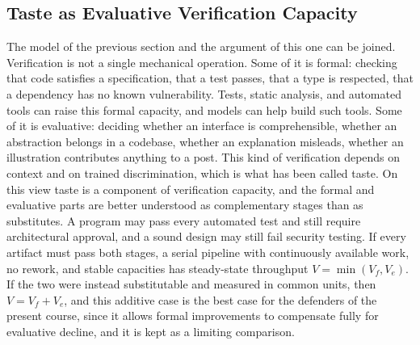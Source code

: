 \documentclass[11pt,a4paper]{article}
\theoremstyle{remark}
\begin{document}
\subsection{Taste as Evaluative Verification Capacity}

The model of the previous section and the argument of this one can be joined. Verification is not a single mechanical operation. Some of it is formal: checking that code satisfies a specification, that a test passes, that a type is respected, that a dependency has no known vulnerability. Tests, static analysis, and automated tools can raise this formal capacity, and models can help build such tools. Some of it is evaluative: deciding whether an interface is comprehensible, whether an abstraction belongs in a codebase, whether an explanation misleads, whether an illustration contributes anything to a post. This kind of verification depends on context and on trained discrimination, which is what has been called taste. On this view taste is a component of verification capacity, and the formal and evaluative parts are better understood as complementary stages than as substitutes. A program may pass every automated test and still require architectural approval, and a sound design may still fail security testing. If every artifact must pass both stages, a serial pipeline with continuously available work, no rework, and stable capacities has steady-state throughput $V=\min(V_f,V_e)$. If the two were instead substitutable and measured in common units, then $V=V_f+V_e$, and this additive case is the best case for the defenders of the present course, since it allows formal improvements to compensate fully for evaluative decline, and it is kept as a limiting comparison.
\end{document}
